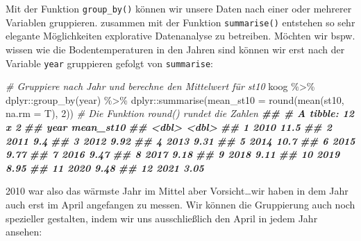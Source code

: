 \documentclass[
]{article}
\newenvironment{Shaded}{\begin{snugshade}}{\end{snugshade}}
\newcommand{\AttributeTok}[1]{\textcolor[rgb]{0.77,0.63,0.00}{#1}}
\newcommand{\CommentTok}[1]{\textcolor[rgb]{0.56,0.35,0.01}{\textit{#1}}}
\newcommand{\DecValTok}[1]{\textcolor[rgb]{0.00,0.00,0.81}{#1}}
\newcommand{\DocumentationTok}[1]{\textcolor[rgb]{0.56,0.35,0.01}{\textbf{\textit{#1}}}}
\newcommand{\FunctionTok}[1]{\textcolor[rgb]{0.00,0.00,0.00}{#1}}
\newcommand{\NormalTok}[1]{#1}
\newcommand{\SpecialCharTok}[1]{\textcolor[rgb]{0.00,0.00,0.00}{#1}}
\begin{document}
Mit der Funktion \texttt{group\_by()} können wir unsere Daten nach einer oder mehrerer Variablen gruppieren. zusammen mit der Funktion \texttt{summarise()} entstehen so sehr elegante Möglichkeiten explorative Datenanalyse zu betreiben. Möchten wir bspw. wissen wie die Bodentemperaturen in den Jahren sind können wir erst nach der Variable \texttt{year} gruppieren gefolgt von \texttt{summarise}:

\begin{Shaded}
\begin{Highlighting}[]
\CommentTok{\# Gruppiere nach Jahr und berechne den Mittelwert für st10}
\NormalTok{koog }\SpecialCharTok{\%\textgreater{}\%}
\NormalTok{  dplyr}\SpecialCharTok{::}\FunctionTok{group\_by}\NormalTok{(year) }\SpecialCharTok{\%\textgreater{}\%}
\NormalTok{  dplyr}\SpecialCharTok{::}\FunctionTok{summarise}\NormalTok{(}\AttributeTok{mean\_st10 =} \FunctionTok{round}\NormalTok{(}\FunctionTok{mean}\NormalTok{(st10, }\AttributeTok{na.rm =}\NormalTok{ T), }\DecValTok{2}\NormalTok{)) }\CommentTok{\# Die Funktion round() rundet die Zahlen}
\DocumentationTok{\#\# \# A tibble: 12 x 2}
\DocumentationTok{\#\#     year mean\_st10}
\DocumentationTok{\#\#    \textless{}dbl\textgreater{}     \textless{}dbl\textgreater{}}
\DocumentationTok{\#\#  1  2010     11.5 }
\DocumentationTok{\#\#  2  2011      9.4 }
\DocumentationTok{\#\#  3  2012      9.92}
\DocumentationTok{\#\#  4  2013      9.31}
\DocumentationTok{\#\#  5  2014     10.7 }
\DocumentationTok{\#\#  6  2015      9.77}
\DocumentationTok{\#\#  7  2016      9.47}
\DocumentationTok{\#\#  8  2017      9.18}
\DocumentationTok{\#\#  9  2018      9.11}
\DocumentationTok{\#\# 10  2019      8.95}
\DocumentationTok{\#\# 11  2020      9.48}
\DocumentationTok{\#\# 12  2021      3.05}
\end{Highlighting}
\end{Shaded}

2010 war also das wärmste Jahr im Mittel aber Vorsicht\ldots wir haben in dem Jahr auch erst im April angefangen zu messen. Wir können die Gruppierung auch noch spezieller gestalten, indem wir uns ausschließlich den April in jedem Jahr ansehen:
\end{document}
